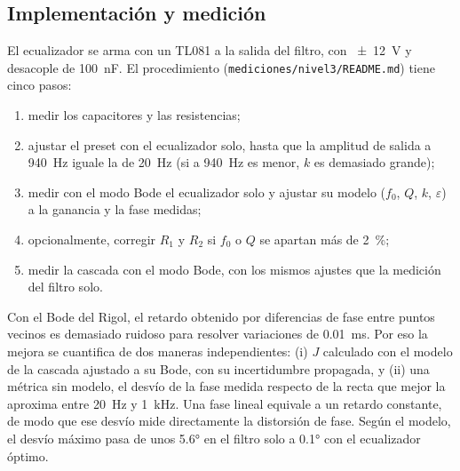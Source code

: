 \subsection{Implementación y medición}
\label{sec:ec_medicion}
El ecualizador se arma con un TL081 a la salida del filtro, con \qty{\pm 12}{\volt} y desacople de \qty{100}{\nano\farad}. El procedimiento
(\texttt{mediciones/nivel3/README.md}) tiene cinco pasos:
\begin{enumerate}
  \item medir los capacitores y las resistencias;
  \item ajustar el preset con el ecualizador solo, hasta que la amplitud de salida a \qty{940}{\hertz} iguale la de \qty{20}{\hertz} (si a
        \qty{940}{\hertz} es menor, $k$ es demasiado grande);
  \item medir con el modo Bode el ecualizador solo y ajustar su modelo ($f_0$, $Q$, $k$, $\varepsilon$) a la ganancia y la fase medidas;
  \item opcionalmente, corregir $R_1$ y $R_2$ si $f_0$ o $Q$ se apartan más de \qty{2}{\percent};
  \item medir la cascada con el modo Bode, con los mismos ajustes que la medición del filtro solo.
\end{enumerate}

Con el Bode del Rigol, el retardo obtenido por diferencias de fase entre puntos vecinos es demasiado ruidoso para resolver variaciones de
\qty{0.01}{\milli\second}. Por eso la mejora se cuantifica de dos maneras independientes: (i) $J$ calculado con el modelo de la cascada ajustado a su
Bode, con su incertidumbre propagada, y (ii) una métrica sin modelo, el desvío de la fase medida respecto de la recta que mejor la aproxima entre
\qty{20}{\hertz} y \qty{1}{\kilo\hertz}. Una fase lineal equivale a un retardo constante, de modo que ese desvío mide directamente la distorsión de
fase. Según el modelo, el desvío máximo pasa de unos \ang{5.6} en el filtro solo a \ang{0.1} con el ecualizador óptimo.

